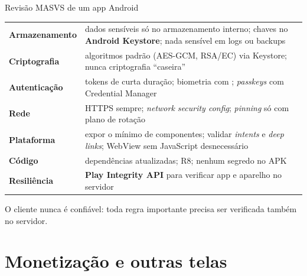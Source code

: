 \documentclass[aspectratio=169,10pt]{beamer}
\begin{document}
\begin{frame}{Revisão MASVS de um app Android}
  \footnotesize
  \begin{tabularx}{\textwidth}{@{}l L@{}}
    \toprule
     &  \\
    \midrule
    \textbf{Armazenamento} & dados sensíveis só no armazenamento interno; chaves no \textbf{Android Keystore}; nada sensível em logs ou backups \\
    \textbf{Criptografia} & algoritmos padrão (AES-GCM, RSA/EC) via Keystore; nunca criptografia ``caseira'' \\
    \textbf{Autenticação} & tokens de curta duração; biometria com ; \emph{passkeys} com Credential Manager \\
    \textbf{Rede} & HTTPS sempre; \emph{network security config}; \emph{pinning} só com plano de rotação \\
    \textbf{Plataforma} & expor o mínimo de componentes; validar \emph{intents} e \emph{deep links}; WebView sem JavaScript desnecessário \\
    \textbf{Código} & dependências atualizadas; R8; nenhum segredo no APK \\
    \textbf{Resiliência} & \textbf{Play Integrity API} para verificar app e aparelho no servidor \\
    \bottomrule
  \end{tabularx}
  \vspace{4pt}
  \begin{destaque}
    O cliente nunca é confiável: toda regra importante precisa ser verificada também no servidor.
  \end{destaque}
\end{frame}

\section{Monetização e outras telas}
\end{document}
